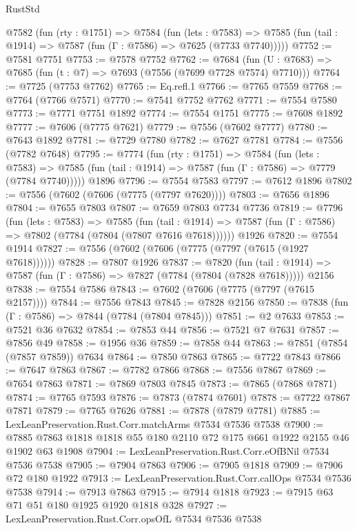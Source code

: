 \begin{lexlean}{RustStd}
\begin{coremodule}
  @7582
    (fun (rty : @1751) =>
    @7584
      (fun (lets : @7583) =>
      @7585 (fun (tail : @1914) => @7587 (fun (Γ : @7586) => @7625 (@7733 @7740)))))
@7752 := @7581 @7751
@7753 := @7578 @7752
@7762 := @7684 (fun (U : @7683) => @7685 (fun (t : @7) => @7693 (@7556 (@7699 @7728 @7574) @7710)))
@7764 := @7725 (@7753 @7762)
@7765 := Eq.refl.{1}
@7766 := @7765 @7559
@7768 := @7764 (@7766 @7571)
@7770 := @7541 @7752 @7762
@7771 := @7554 @7580
@7773 := @7771 @7751 @1892
@7774 := @7554 @1751
@7775 := @7608 @1892
@7777 := @7606 (@7775 @7621)
@7779 := @7556 (@7602 @7777)
@7780 := @7643 @1892
@7781 := @7729 @7780
@7782 := @7627 @7781
@7784 := @7556 (@7782 @7648)
@7795 := @7774
    (fun (rty : @1751) =>
    @7584
      (fun (lets : @7583) =>
      @7585 (fun (tail : @1914) => @7587 (fun (Γ : @7586) => @7779 (@7784 @7740)))))
    @1896
@7796 := @7554 @7583
@7797 := @7612 @1896
@7802 := @7556 (@7602 (@7606 (@7775 (@7797 @7620))))
@7803 := @7656 @1896
@7804 := @7655 @7803
@7807 := @7659 @7803 @7734 @7736
@7819 := @7796
    (fun (lets : @7583) =>
    @7585
      (fun (tail : @1914) => @7587 (fun (Γ : @7586) => @7802 (@7784 (@7804 (@7807 @7616 @7618))))))
    @1926
@7820 := @7554 @1914
@7827 := @7556 (@7602 (@7606 (@7775 (@7797 (@7615 (@1927 @7618))))))
@7828 := @7807 @1926
@7837 := @7820
    (fun (tail : @1914) => @7587 (fun (Γ : @7586) => @7827 (@7784 (@7804 (@7828 @7618)))))
    @2156
@7838 := @7554 @7586
@7843 := @7602 (@7606 (@7775 (@7797 (@7615 @2157))))
@7844 := @7556 @7843
@7845 := @7828 @2156
@7850 := @7838 (fun (Γ : @7586) => @7844 (@7784 (@7804 @7845)))
@7851 := @2 @7633
@7853 := @7521 @36 @7632
@7854 := @7853 @44
@7856 := @7521 @7 @7631
@7857 := @7856 @49
@7858 := @1956 @36
@7859 := @7858 @44
@7863 := @7851 (@7854 (@7857 @7859)) @7634
@7864 := @7850 @7863
@7865 := @7722 @7843
@7866 := @7647 @7863
@7867 := @7782 @7866
@7868 := @7556 @7867
@7869 := @7654 @7863
@7871 := @7869 @7803 @7845
@7873 := @7865 (@7868 @7871)
@7874 := @7765 @7593
@7876 := @7873 (@7874 @7601)
@7878 := @7722 @7867 @7871
@7879 := @7765 @7626
@7881 := @7878 (@7879 @7781)
@7885 := LexLeanPreservation.Rust.Corr.matchArms @7534 @7536 @7538
@7900 := @7885 @7863 @1818 @1818 @55 @180 @2110 @72 @175 @661 @1922 @2155 @46 @1902 @63 @1908
@7904 := LexLeanPreservation.Rust.Corr.eOfBNil @7534 @7536 @7538
@7905 := @7904 @7863
@7906 := @7905 @1818
@7909 := @7906 @72 @180 @1922
@7913 := LexLeanPreservation.Rust.Corr.callOps @7534 @7536 @7538
@7914 := @7913 @7863
@7915 := @7914 @1818
@7923 := @7915 @63 @71 @51 @180 @1925 @1920 @1818 @328
@7927 := LexLeanPreservation.Rust.Corr.opsOfL @7534 @7536 @7538

\end{coremodule}
\end{lexlean}
